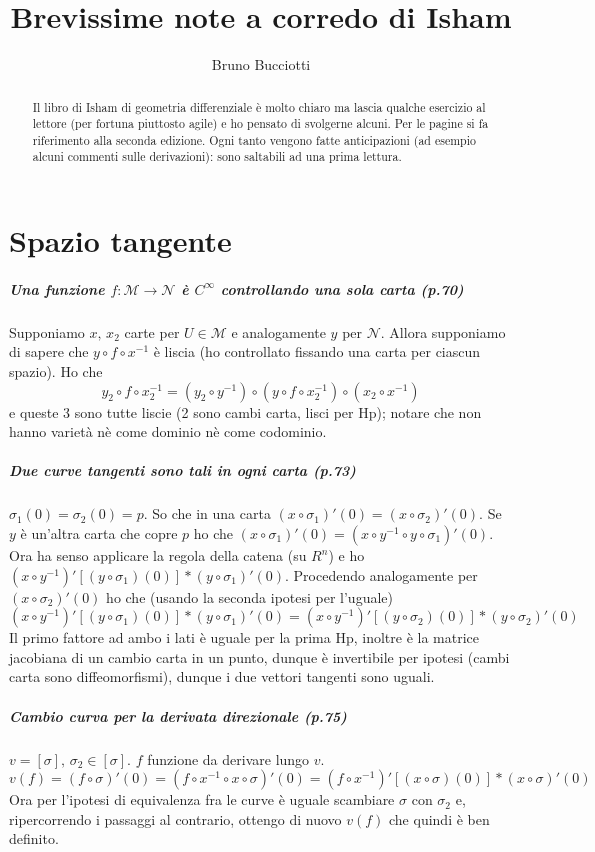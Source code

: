 \documentclass[]{article}
\title{Brevissime note a corredo di Isham}
\author{Bruno Bucciotti}
\begin{document}
\maketitle

\begin{abstract}
Il libro di Isham di geometria differenziale è molto chiaro ma lascia qualche esercizio al lettore (per fortuna piuttosto agile) e ho pensato di svolgerne alcuni. Per le pagine si fa riferimento alla seconda edizione. Ogni tanto vengono fatte anticipazioni (ad esempio alcuni commenti sulle derivazioni): sono saltabili ad una prima lettura.
\end{abstract}

\section{Spazio tangente}
\subparagraph{Una funzione $f:\mathcal{M} \rightarrow \mathcal{N}$ è $C^\infty$ controllando una sola carta (p.70)}
Supponiamo $x,\, x_2$ carte per $U \in \mathcal{M}$ e analogamente $y$ per $\mathcal{N}$. Allora supponiamo di sapere che $y \circ f \circ x^{-1}$ è liscia (ho controllato fissando una carta per ciascun spazio). Ho che $$y_2 \circ f \circ x_2^{-1} = (y_2 \circ y^{-1}) \circ (y \circ f \circ x_2^{-1}) \circ (x_2 \circ x^{-1})$$ e queste 3 sono tutte liscie (2 sono cambi carta, lisci per Hp); notare che non hanno varietà nè come dominio nè come codominio.

\subparagraph{Due curve tangenti sono tali in ogni carta (p.73)}
$\sigma_1 (0) = \sigma_2 (0) = p$. So che in una carta $(x \circ \sigma_1)'(0) = (x \circ \sigma_2)'(0)$. Se $y$ è un'altra carta che copre $p$ ho che $(x \circ \sigma_1)'(0) = (x \circ y^{-1} \circ y \circ \sigma_1)'(0)$. Ora ha senso applicare la regola della catena (su $R^n$) e ho $(x \circ y^{-1})'[(y \circ \sigma_1)(0)] * (y \circ \sigma_1)'(0)$. Procedendo analogamente per $(x \circ \sigma_2)'(0)$ ho che (usando la seconda ipotesi per l'uguale)
$$ (x \circ y^{-1})'[(y \circ \sigma_1)(0)] * (y \circ \sigma_1)'(0) = (x \circ y^{-1})'[(y \circ \sigma_2)(0)] * (y \circ \sigma_2)'(0)$$
Il primo fattore ad ambo i lati è uguale  per la prima Hp, inoltre è la matrice jacobiana di un cambio carta in un punto, dunque è invertibile per ipotesi (cambi carta sono diffeomorfismi), dunque i due vettori tangenti sono uguali.

\subparagraph{Cambio curva per la derivata direzionale (p.75)}
$v = [\sigma],\, \sigma_2 \in [\sigma]$. $f$ funzione da derivare lungo $v$.
$$v(f) = (f \circ \sigma)'(0) = (f \circ x^{-1} \circ x \circ \sigma)'(0) = (f \circ x^{-1})'[(x \circ \sigma)(0)] * (x \circ \sigma)'(0)$$
Ora per l'ipotesi di equivalenza fra le curve è uguale scambiare $\sigma$ con $\sigma_2$ e, ripercorrendo i passaggi al contrario, ottengo di nuovo $v(f)$ che quindi è ben definito.
\end{document}
